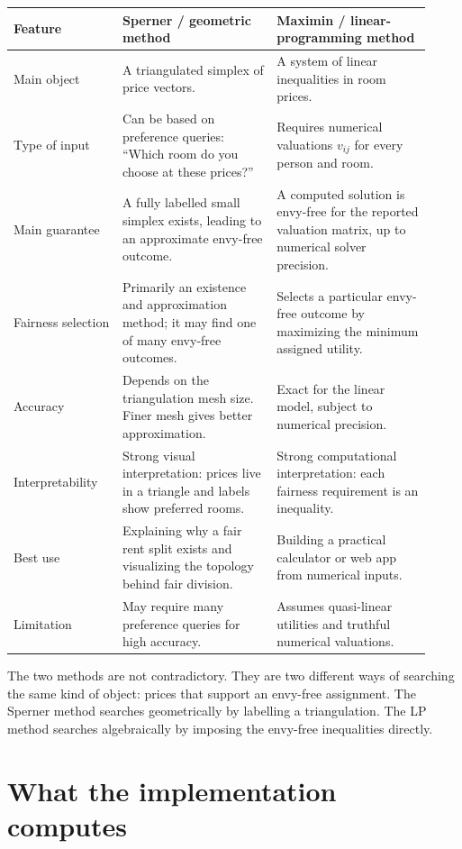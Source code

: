 \documentclass[11pt]{article}
\begin{document}
\begin{longtable}{>{\raggedright\arraybackslash}p{0.24\linewidth}>{\raggedright\arraybackslash}p{0.34\linewidth}>{\raggedright\arraybackslash}p{0.34\linewidth}}
\toprule
\textbf{Feature} & \textbf{Sperner / geometric method} & \textbf{Maximin / linear-programming method} \\
\midrule
Main object
& A triangulated simplex of price vectors.
& A system of linear inequalities in room prices. \\
\addlinespace
Type of input
& Can be based on preference queries: ``Which room do you choose at these prices?''
& Requires numerical valuations $v_{ij}$ for every person and room. \\
\addlinespace
Main guarantee
& A fully labelled small simplex exists, leading to an approximate envy-free outcome.
& A computed solution is envy-free for the reported valuation matrix, up to numerical solver precision. \\
\addlinespace
Fairness selection
& Primarily an existence and approximation method; it may find one of many envy-free outcomes.
& Selects a particular envy-free outcome by maximizing the minimum assigned utility. \\
\addlinespace
Accuracy
& Depends on the triangulation mesh size. Finer mesh gives better approximation.
& Exact for the linear model, subject to numerical precision. \\
\addlinespace
Interpretability
& Strong visual interpretation: prices live in a triangle and labels show preferred rooms.
& Strong computational interpretation: each fairness requirement is an inequality. \\
\addlinespace
Best use
& Explaining why a fair rent split exists and visualizing the topology behind fair division.
& Building a practical calculator or web app from numerical inputs. \\
\addlinespace
Limitation
& May require many preference queries for high accuracy.
& Assumes quasi-linear utilities and truthful numerical valuations. \\
\bottomrule
\end{longtable}

The two methods are not contradictory. They are two different ways of searching the same kind of object: prices that support an envy-free assignment. The Sperner method searches geometrically by labelling a triangulation. The LP method searches algebraically by imposing the envy-free inequalities directly.

\section{What the implementation computes}
\end{document}
